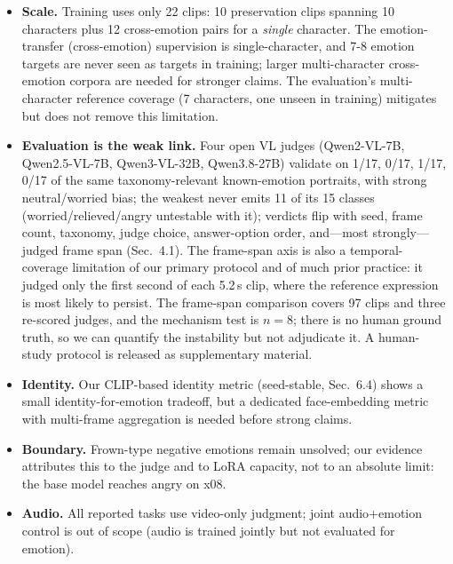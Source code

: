 \documentclass[conference]{IEEEtran}
\begin{document}
\begin{itemize}
\item \textbf{Scale.} Training uses only 22 clips: 10 preservation clips spanning 10 characters
plus 12 cross-emotion pairs for a \emph{single} character. The emotion-transfer (cross-emotion)
supervision is single-character, and 7-8 emotion targets are never seen as targets in training;
larger multi-character cross-emotion corpora are needed for stronger claims. The evaluation's
multi-character reference coverage (7 characters, one unseen in training) mitigates but does not
remove this limitation.
\item \textbf{Evaluation is the weak link.} Four open VL judges (Qwen2-VL-7B, Qwen2.5-VL-7B,
Qwen3-VL-32B, Qwen3.8-27B) validate on 1/17, 0/17, 1/17, 0/17 of the same taxonomy-relevant
known-emotion portraits, with strong neutral/worried bias; the weakest never emits 11 of its 15
classes (worried/relieved/angry untestable with it); verdicts flip with seed, frame count, taxonomy,
judge choice, answer-option order, and---most strongly---judged frame span (Sec.~4.1). The frame-span
axis is also a temporal-coverage limitation of our primary protocol and of much prior practice: it
judged only the first second of each 5.2\,s clip, where the reference expression is most likely to
persist. The frame-span comparison covers 97 clips and three re-scored judges, and the mechanism test is
$n{=}8$; there is no human ground truth, so we can quantify the instability but not adjudicate it. A
human-study protocol is released as supplementary material.
\item \textbf{Identity.} Our CLIP-based identity metric (seed-stable, Sec.~6.4) shows a small
identity-for-emotion tradeoff, but a dedicated face-embedding metric with multi-frame aggregation
is needed before strong claims.
\item \textbf{Boundary.} Frown-type negative emotions remain unsolved; our evidence attributes
this to the judge and to LoRA capacity, not to an absolute limit: the base model reaches angry on x08.
\item \textbf{Audio.} All reported tasks use video-only judgment; joint audio+emotion control is
out of scope (audio is trained jointly but not evaluated for emotion).
\end{itemize}
\end{document}
